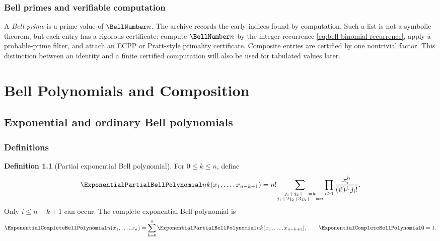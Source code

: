 \documentclass[11pt,a4paper,oneside,openany]{book}
\theoremstyle{definition}
\newtheorem{definition}[theorem]{Definition}
\theoremstyle{remark}
\begin{document}
\section{Bell primes and verifiable computation}
A \emph{Bell prime} is a prime value of $\BellNumber n$.  The archive records the early
indices found by computation.  Such a list is not a symbolic theorem, but each
entry has a rigorous certificate: compute $\BellNumber n$ by the integer recurrence
\eqref{eq:bell-binomial-recurrence}, apply a probable-prime filter, and attach an
ECPP or Pratt-style primality certificate.  Composite entries are certified by one
nontrivial factor.  This distinction between an identity and a finite certified
computation will also be used for tabulated values later.

\part{Bell Polynomials and Composition}

\chapter{Exponential and ordinary Bell polynomials}

\section{Definitions}
\begin{definition}[Partial exponential Bell polynomial]
For $0\le k\le n$, define
\begin{equation}\label{eq:partial-bell-definition}
 \ExponentialPartialBellPolynomial nk(x_1,\ldots,x_{n-k+1})
 =n!\!\sum_{\substack{j_1+j_2+\cdots=k\\
                       j_1+2j_2+3j_3+\cdots=n}}
 \prod_{i\ge1}\frac{x_i^{j_i}}{(i!)^{j_i}j_i!}.
\end{equation}
Only $i\le n-k+1$ can occur.  The complete exponential Bell polynomial is
\begin{equation}\label{eq:complete-bell-definition}
 \ExponentialCompleteBellPolynomial n(x_1,\ldots,x_n)=\sum_{k=0}^{n}\ExponentialPartialBellPolynomial nk(x_1,\ldots,x_{n-k+1}),
 \qquad \ExponentialCompleteBellPolynomial0=1.
\end{equation}
\end{definition}
\end{document}
